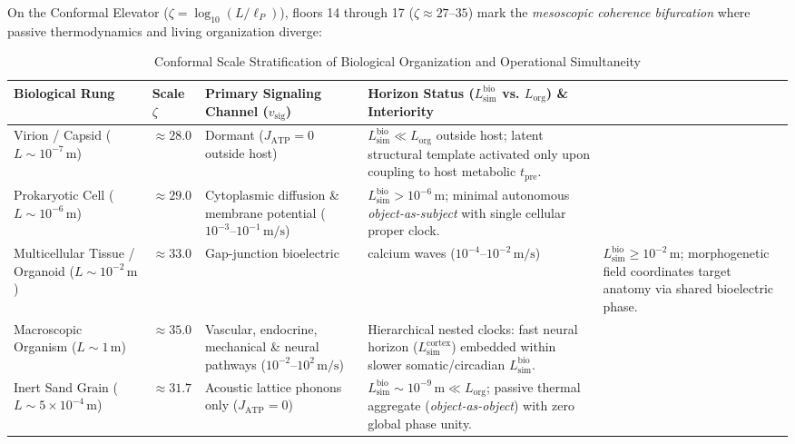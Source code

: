 \documentclass[11pt,a4paper]{article}
\begin{document}
On the Conformal Elevator ($\zeta = \log_{10}(L/\ell_P)$), floors 14 through 17 ($\zeta \approx 27\text{--}35$) mark the \emph{mesoscopic coherence bifurcation} where passive thermodynamics and living organization diverge:

\begin{table}[htbp]
\centering
\caption{Conformal Scale Stratification of Biological Organization and Operational Simultaneity}
\label{tab:conformal_bio}
\small
\begin{tabularx}{\textwidth}{>{\raggedright\arraybackslash}p{2.6cm} >{\centering\arraybackslash}p{1.6cm} >{\raggedright\arraybackslash}p{3.2cm} >{\raggedright\arraybackslash}X}
\toprule
\textbf{Biological Rung} & \textbf{Scale $\zeta$} & \textbf{Primary Signaling Channel ($v_{\mathrm{sig}}$)} & \textbf{Horizon Status ($L_{\mathrm{sim}}^{\mathrm{bio}}$ vs. $L_{\mathrm{org}}$) \& Interiority} \\
\midrule
Virion / Capsid ($L \sim 10^{-7}\,\mathrm{m}$) & $\approx 28.0$ & Dormant ($J_{\mathrm{ATP}} = 0$ outside host) & $L_{\mathrm{sim}}^{\mathrm{bio}} \ll L_{\mathrm{org}}$ outside host; latent structural template activated only upon coupling to host metabolic $t_{\mathrm{pre}}$. \\
\addlinespace
Prokaryotic Cell ($L \sim 10^{-6}\,\mathrm{m}$) & $\approx 29.0$ & Cytoplasmic diffusion \& membrane potential ($10^{-3}\text{--}10^{-1}\,\mathrm{m/s}$) & $L_{\mathrm{sim}}^{\mathrm{bio}} > 10^{-6}\,\mathrm{m}$; minimal autonomous \emph{object-as-subject} with single cellular proper clock. \\
\addlinespace
Multicellular Tissue / Organoid ($L \sim 10^{-2}\,\mathrm{m}$) & $\approx 33.0$ & Gap-junction bioelectric & calcium waves ($10^{-4}\text{--}10^{-2}\,\mathrm{m/s}$) & $L_{\mathrm{sim}}^{\mathrm{bio}} \ge 10^{-2}\,\mathrm{m}$; morphogenetic field coordinates target anatomy via shared bioelectric phase. \\
\addlinespace
Macroscopic Organism ($L \sim 1\,\mathrm{m}$) & $\approx 35.0$ & Vascular, endocrine, mechanical \& neural pathways ($10^{-2}\text{--}10^{2}\,\mathrm{m/s}$) & Hierarchical nested clocks: fast neural horizon ($L_{\mathrm{sim}}^{\mathrm{cortex}}$) embedded within slower somatic/circadian $L_{\mathrm{sim}}^{\mathrm{bio}}$. \\
\addlinespace
Inert Sand Grain ($L \sim 5 \times 10^{-4}\,\mathrm{m}$) & $\approx 31.7$ & Acoustic lattice phonons only ($J_{\mathrm{ATP}} = 0$) & $L_{\mathrm{sim}}^{\mathrm{bio}} \sim 10^{-9}\,\mathrm{m} \ll L_{\mathrm{org}}$; passive thermal aggregate (\emph{object-as-object}) with zero global phase unity. \\
\bottomrule
\end{tabularx}
\end{table}
\end{document}
